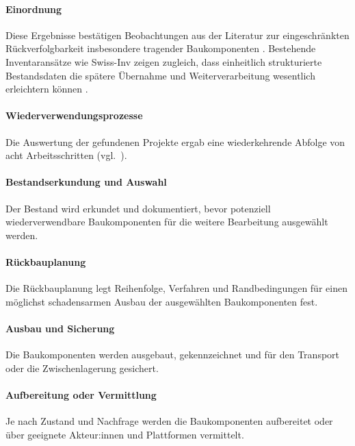 \documentclass[type=zwischenbericht]{zukunftbau}
\begin{document}
\begin{SemioNest}
\begin{SemioNest}
\paragraph{Einordnung}
Diese Ergebnisse bestätigen Beobachtungen aus der Literatur zur eingeschränkten Rückverfolgbarkeit insbesondere tragender Baukomponenten \cite{densley-tingley-cooper-cullen-structural-steel-reuse-2017,sivers-fivet-reuse-market-dynamics-2025}. Bestehende Inventaransätze wie Swiss-Inv zeigen zugleich, dass einheitlich strukturierte Bestandsdaten die spätere Übernahme und Weiterverarbeitung wesentlich erleichtern können \cite{cirkla-swiss-inv}.
\end{SemioNest}

\paragraph{Wiederverwendungsprozesse}
\label{abschnitt:wiederverwendungsprozesse}
Die Auswertung der gefundenen Projekte ergab eine wiederkehrende Abfolge von acht Arbeitsschritten (vgl.\ ).


\begin{SemioNest}
\paragraph{Bestandserkundung und Auswahl}
Der Bestand wird erkundet und dokumentiert, bevor potenziell wiederverwendbare Baukomponenten für die weitere Bearbeitung ausgewählt werden.

\paragraph{Rückbauplanung}
Die Rückbauplanung legt Reihenfolge, Verfahren und Randbedingungen für einen möglichst schadensarmen Ausbau der ausgewählten Baukomponenten fest.

\paragraph{Ausbau und Sicherung}
Die Baukomponenten werden ausgebaut, gekennzeichnet und für den Transport oder die Zwischenlagerung gesichert.

\paragraph{Aufbereitung oder Vermittlung}
Je nach Zustand und Nachfrage werden die Baukomponenten aufbereitet oder über geeignete Akteur:innen und Plattformen vermittelt.


\end{SemioNest}
\end{SemioNest}
\end{document}
